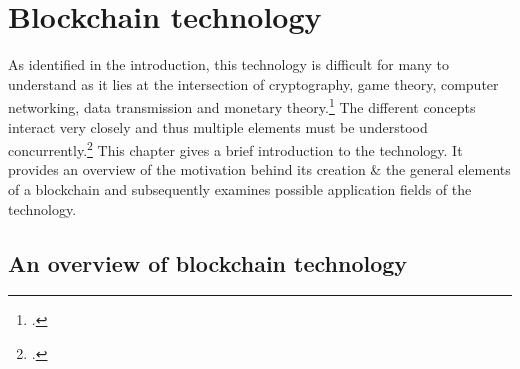\chapter{Blockchain technology} \label{chap:Blockchain}

As identified in the introduction, this technology is difficult for many to understand as it lies at the intersection of cryptography, game theory, computer networking, data transmission and monetary theory.\footcite[Cf.][]{LoppNobodyUnderstandsBitcoin2017} The different concepts interact very closely and thus multiple elements must be understood concurrently.\footcite[Cf.][p.2]{SwellerVisualisationInstructionalDesign2002} This chapter gives a  brief introduction to the technology. It provides an overview of the motivation behind its creation \& the general elements of a blockchain and subsequently examines possible application fields of the technology. 

\section{An overview of blockchain technology} \label{sec:Blockchain}


